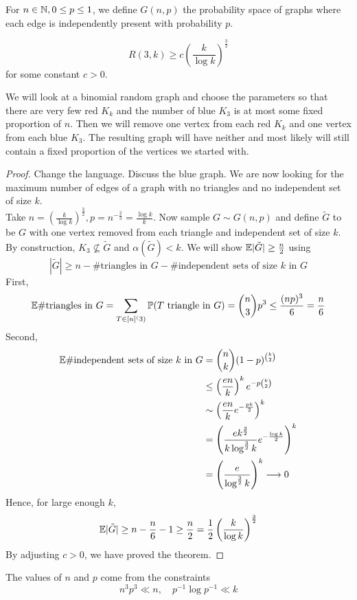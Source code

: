 \documentclass{article}
\begin{document}
\begin{defi}
  For $n \in \mathbb N, 0 \le p \le 1$, we define $G(n, p)$ the probability space of graphs where each edge is independently present with probability $p$.
\end{defi}

\begin{thm}[Erd\H os]
  $$R(3, k) \ge c\left(\frac k{\log k}\right)^{\frac 32}$$
  for some constant $c > 0$.
\end{thm}
\begin{idea}
  We will look at a binomial random graph and choose the parameters so that there are very few red $K_k$ and the number of blue $K_3$ is at most some fixed proportion of $n$. Then we will remove one vertex from each red $K_k$ and one vertex from each blue $K_3$. The resulting graph will have neither and most likely will still contain a fixed proportion of the vertices we started with.
\end{idea}
\begin{proof}
  Change the language. Discuss the blue graph. We are now looking for the maximum number of edges of a graph with no triangles and no independent set of size $k$. \\
  Take $n = \left(\frac k{\log k}\right)^{\frac 32}, p = n^{-\frac 23} = \frac{\log k}k$. Now sample $G \sim G(n, p)$ and define $\tilde G$ to be $G$ with one vertex removed from each triangle and independent set of size $k$. By construction, $K_3 \not\subseteq \tilde G$ and $\alpha(\tilde G) < k$. We will show $\mathbb E |\tilde G| \ge \frac n2$ using
  $$|\tilde G| \ge n - \#\text{triangles in } G - \#\text{independent sets of size $k$ in } G$$
  First,
  $$\mathbb E \#\text{triangles in } G
  = \sum_{T \in [n]^(3)} \mathbb P(T \text { triangle in } G)
  = \binom n3 p^3 \le \frac{(np)^3}6 = \frac n6$$
  Second,
  \begin{align*}
    \mathbb E \#\text{independent sets of size $k$ in } G
    & = \binom nk (1 - p)^{\binom k2} \\
    & \le \left(\frac{en}k\right)^k e^{-p\binom k2} \\
    & \sim \left(\frac{en}k e^{-\frac{pk}2}\right)^k \\
    & = \left(\frac{ek^{\frac 32}}{k\log^{\frac 32} k} e^{-\frac{\log k}2}\right)^k \\
    & = \left(\frac e{\log^{\frac 32} k}\right)^k \longrightarrow 0
  \end{align*}
  Hence, for large enough $k$,
  $$\mathbb E |\tilde G| \ge n - \frac n6 - 1 \ge \frac n2 = \frac 12 \left(\frac k{\log k}\right)^{\frac 32}$$
  By adjusting $c > 0$, we have proved the theorem.
\end{proof}
\begin{rmk}
  The values of $n$ and $p$ come from the constraints
  $$n^3p^3 \ll n, \quad p^{-1}\log p^{-1} \ll k$$
\end{rmk}
\end{document}

